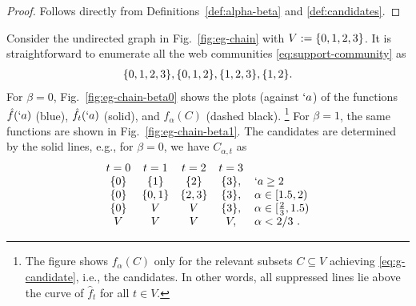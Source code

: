 \begin{proof}
	Follows directly from Definitions~\ref{def:alpha-beta} and \ref{def:candidates}.
\end{proof}

\begin{example}
	\label{eg:chain-community}
	Consider the undirected graph in Fig.~\ref{fig:eg-chain} with $V:=\{0,1,2,3\}$.
%
	It is straightforward to enumerate all the web communities \eqref{eq:support-community} as
	\begin{align}
		\label{eq:chain-communities}
		\Set{0,1,2,3},
		\Set{0,1,2},
		\Set{1,2,3}, %
		\Set{1,2}.
	\end{align}
%
	For $\beta = 0$, Fig.~\ref{fig:eg-chain-beta0}
	shows the plots (against $`a$) of the functions $\hat{f}(`a)$ (blue), $\hat{f}_{t}(`a)$
	(solid), and
	$f_{\alpha}(C)$ (dashed black).%
	\footnote{
	The figure shows $f_{\alpha}(C)$ only for the relevant
	subsets $C\subseteq V$ achieving \eqref{eq:g-candidate}, i.e., the candidates. In
	other words, all suppressed lines lie above the curve of $\hat{f}_{t}$ for all $t\in V$.
	}
	For $\beta = 1$, the same functions are shown in Fig.~\ref{fig:eg-chain-beta1}.
	The candidates are determined by the solid lines,
	e.g., for $\beta = 0$, we have $C_{\alpha,t}$ as
	\begin{align}
		\label{eq:eg-chain-candidates}
		\begin{array}{ccccl}
			 t=0 & t=1 & t=2 & t=3 &
			\\
			 \{0\} & \{1\} & \{2\} & \{3\}, & `a \geq  2 \\
			 \{0\} & \{0,1\} & \{2,3\} & \{3\}, &  \alpha \in  [1.5,2) \\
			 \{0\} & V & V & \{3\}, &  \alpha \in  [\frac{2}{3},1.5) \\
			 V & V & V & V, &  \alpha < 2/3 \ . \\
		\end{array}
	\end{align}

\end{example}
